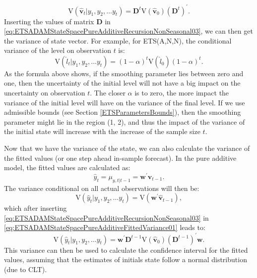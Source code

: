 \documentclass[]{book}
\theoremstyle{definition}
\theoremstyle{definition}
\theoremstyle{definition}
\theoremstyle{definition}
\theoremstyle{remark}
\begin{document}
\begin{equation}
    \mathrm{V}(\hat{\mathbf{v}}_{t} | y_1, y_2, \dots y_t) = \mathbf{D}^{t} \mathrm{V}\left( \hat{\mathbf{v}}_{0} \right) \left(\mathbf{D}^{t}\right)^\prime .
  \label{eq:ETSADAMStateSpacePureAdditiveRecursionNonSeasonal03}
\end{equation}
Inserting the values of matrix \(\mathbf{D}\) in \eqref{eq:ETSADAMStateSpacePureAdditiveRecursionNonSeasonal03}, we can then get the variance of state vector. For example, for ETS(A,N,N), the conditional variance of the level on observation \(t\) is:
\begin{equation}
    \mathrm{V}(\hat{l}_{t} | y_1, y_2, \dots y_t) = (1-\alpha)^{t} \mathrm{V}\left( \hat{l}_{0} \right) (1-\alpha)^{t} .
  \label{eq:ETSADAMStateSpacePureAdditiveRecursionANN}
\end{equation}
As the formula above shows, if the smoothing parameter lies between zero and one, then the uncertainty of the initial level will not have a big impact on the uncertainty on observation \(t\). The closer \(\alpha\) is to zero, the more impact the variance of the initial level will have on the variance of the final level. If we use admissible bounds (see Section \ref{ETSParametersBounds}), then the smoothing parameter might lie in the region (1, 2), and thus the impact of the variance of the initial state will increase with the increase of the sample size \(t\).

Now that we have the variance of the state, we can also calculate the variance of the fitted values (or one step ahead in-sample forecast). In the pure additive model, the fitted values are calculated as:
\begin{equation}
    \hat{y}_t = \mu_{y,t|t-1} = \mathbf{w}^\prime \hat{\mathbf{v}}_{t-1}.
  \label{eq:ETSADAMStateSpacePureAdditiveFitted}
\end{equation}
The variance conditional on all actual observations will then be:
\begin{equation}
    \mathrm{V}(\hat{y}_t | y_1, y_2, \dots y_t) = \mathrm{V}\left( \mathbf{w}^\prime \hat{\mathbf{v}}_{t-1} \right) ,
  \label{eq:ETSADAMStateSpacePureAdditiveFittedVariance01}
\end{equation}
which after inserting \eqref{eq:ETSADAMStateSpacePureAdditiveRecursionNonSeasonal03} in \eqref{eq:ETSADAMStateSpacePureAdditiveFittedVariance01} leads to:
\begin{equation}
    \mathrm{V}(\hat{y}_t | y_1, y_2, \dots y_t) = \mathbf{w}^\prime \mathbf{D}^{t-1} \mathrm{V}\left( \hat{\mathbf{v}}_{0} \right) \left(\mathbf{D}^{t-1}\right)^\prime \mathbf{w} .
  \label{eq:ETSADAMStateSpacePureAdditiveFittedVariance02}
\end{equation}
This variance can then be used to calculate the confidence interval for the fitted values, assuming that the estimates of initials state follow a normal distribution (due to CLT).
\end{document}
